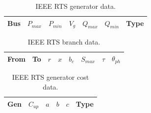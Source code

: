 \begin{table}[h]
\begin{center}
\begin{tabular}{c|c|c|c|c|c|c}
\hline
Bus &$P_{max}$ &$P_{min}$ &$V_g$ &$Q_{max}$ &$Q_{min}$ &Type\\
\hline\hline

\hline
\end{tabular}
\caption{IEEE RTS generator data.}
\label{tbl:rtsgen}
\end{center}
\end{table}

\begin{table}[h]
\begin{center}
\begin{tabular}{c|c|c|c|c|c|c|c}
\hline
From &To &$r$ &$x$ &$b_c$ &$S_{max}$ &$\tau$ &$\theta_{ph}$\\
\hline\hline

\hline
\end{tabular}
\caption{IEEE RTS branch data.}
\label{tbl:rtsbranch}
\end{center}
\end{table}

\begin{table}[h]
\begin{center}
\begin{tabular}{c|c|c|c|c|c}
\hline
Gen &$C_{up}$ &$a$ &$b$ &$c$ &Type\\
\hline\hline

\hline
\end{tabular}
\caption{IEEE RTS generator cost data.}
\label{tbl:rtsgencost}
\end{center}
\end{table}
